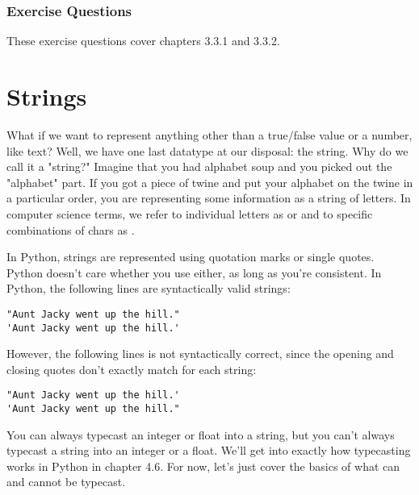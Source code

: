 \subsubsection*{Exercise Questions}
These exercise questions cover chapters 3.3.1 and 3.3.2. 
\begin{Exercise}
\end{Exercise}
\begin{Exercise}
\end{Exercise}
\section{Strings}
What if we want to represent anything other than a true/false value or a number, like text? Well, we have one last datatype at our disposal: the string. Why do we call it a "string?" Imagine that you had alphabet soup and you picked out the "alphabet" part. If you got a piece of twine and put your alphabet on the twine in a particular order, you are representing some information as a string of letters. In computer science terms, we refer to individual letters as  or  and to specific combinations of chars as .\par
In Python, strings are represented using quotation marks or single quotes. Python doesn't care whether you use either, as long as you're consistent. In Python, the following lines are syntactically valid strings:
\begin{lstlisting}[style=pippython]
"Aunt Jacky went up the hill."
'Aunt Jacky went up the hill.'
\end{lstlisting}
However, the following lines is not syntactically correct, since the opening and closing quotes don't exactly match for each string:
\begin{lstlisting}[style=pippython]
"Aunt Jacky went up the hill.'
'Aunt Jacky went up the hill."
\end{lstlisting}
You can always typecast an integer or float into a string, but you can't always typecast a string into an integer or a float. We'll get into exactly how typecasting works in Python in chapter 4.6. For now, let's just cover the basics of what can and cannot be typecast.\par
